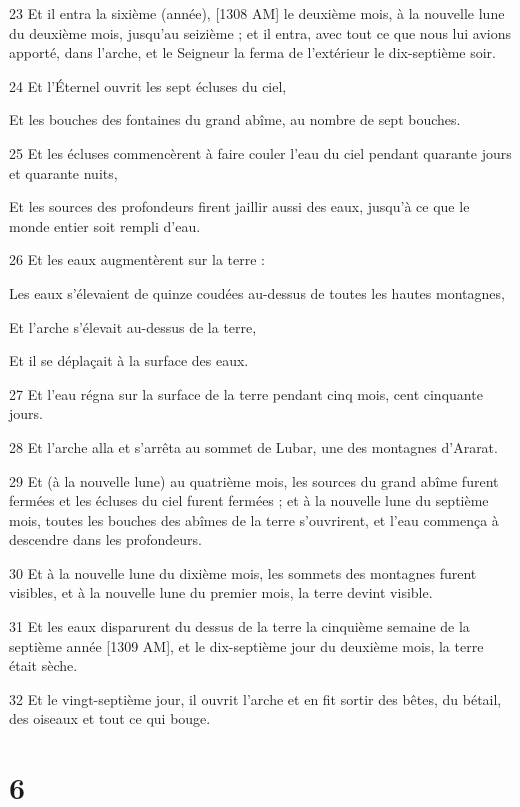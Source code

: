 \par 23 Et il entra la sixième (année), [1308 AM] le deuxième mois, à la nouvelle lune du deuxième mois, jusqu'au seizième ; et il entra, avec tout ce que nous lui avions apporté, dans l'arche, et le Seigneur la ferma de l'extérieur le dix-septième soir.
\par 24 Et l'Éternel ouvrit les sept écluses du ciel,  
\par     Et les bouches des fontaines du grand abîme, au nombre de sept bouches.
\par 25 Et les écluses commencèrent à faire couler l'eau du ciel pendant quarante jours et quarante nuits,  
\par     Et les sources des profondeurs firent jaillir aussi des eaux, jusqu'à ce que le monde entier soit rempli d'eau.
\par 26 Et les eaux augmentèrent sur la terre :  
\par     Les eaux s'élevaient de quinze coudées au-dessus de toutes les hautes montagnes,  
\par     Et l'arche s'élevait au-dessus de la terre,  
\par     Et il se déplaçait à la surface des eaux.
\par 27 Et l'eau régna sur la surface de la terre pendant cinq mois, cent cinquante jours.
\par 28 Et l'arche alla et s'arrêta au sommet de Lubar, une des montagnes d'Ararat.
\par 29 Et (à la nouvelle lune) au quatrième mois, les sources du grand abîme furent fermées et les écluses du ciel furent fermées ; et à la nouvelle lune du septième mois, toutes les bouches des abîmes de la terre s'ouvrirent, et l'eau commença à descendre dans les profondeurs.
\par 30 Et à la nouvelle lune du dixième mois, les sommets des montagnes furent visibles, et à la nouvelle lune du premier mois, la terre devint visible.
\par 31 Et les eaux disparurent du dessus de la terre la cinquième semaine de la septième année [1309 AM], et le dix-septième jour du deuxième mois, la terre était sèche.
\par 32 Et le vingt-septième jour, il ouvrit l'arche et en fit sortir des bêtes, du bétail, des oiseaux et tout ce qui bouge.

\chapter{6}

